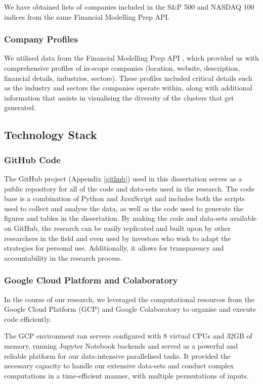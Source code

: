 \documentclass[11pt]{article}
\begin{document}
We have obtained lists of companies included in the S\&P 500 and NASDAQ 100 indices from the same Financial Modelling Prep API.

\subsubsection{Company Profiles}

We utilised data from the Financial Modelling Prep API \cite{fmpapi}, which provided us with comprehensive profiles of in-scope companies (location, website, description, financial details, industries, sectors). These profiles included critical details such as the industry and sectors the companies operate within, along with additional information that assists in visualising the diversity of the clusters that get generated. 



\subsection{Technology Stack}

\subsubsection{GitHub Code}

The GitHub project (Appendix \ref{github}) used in this dissertation serves as a public repository for all of the code and data-sets used in the research. The code base is a combination of Python and JavaScript and includes both the scripts used to collect and analyse the data, as well as the code used to generate the figures and tables in the dissertation. By making the code and data-sets available on GitHub, the research can be easily replicated and built upon by other researchers in the field and even used by investors who wish to adapt the strategies for personal use. Additionally, it allows for transparency and accountability in the research process. 


\subsubsection{Google Cloud Platform and Colaboratory}
In the course of our research, we leveraged the computational resources from the Google Cloud Platform (GCP) and Google Colaboratory to organise and execute code efficiently. 

The GCP environment ran servers configured with 8 virtual CPUs and 32GB of memory, running Jupyter Notebook backends and served as a powerful and reliable platform for our data-intensive parallelised tasks. It provided the necessary capacity to handle our extensive data-sets and conduct complex computations in a time-efficient manner, with multiple permutations of inputs.
\end{document}
